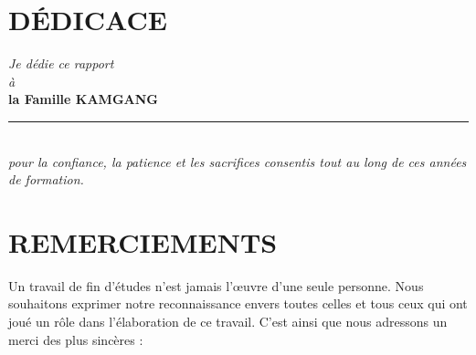 
\chapter*{DÉDICACE}

\vspace*{\fill}
\begin{center}
\begin{tcolorbox}[enhanced, nobeforeafter,
    colback=keycesoft, colframe=keyceaccent,
    boxrule=1.2pt, arc=10pt,
    width=0.78\textwidth,
    left=16pt, right=16pt, top=22pt, bottom=22pt,
    borderline={0.4pt}{5pt}{keyceaccent!55}]
  \centering
  {\large\itshape\color{keycegrey} Je dédie ce rapport}\\[12pt]
  {\large\itshape\color{keycegrey} à}\\[12pt]
  {\fontsize{19}{23}\selectfont\bfseries\color{keyceblue} la Famille KAMGANG}\\[16pt]
  {\color{keyceaccent}\rule{0.42\textwidth}{0.8pt}}\\[16pt]
  {\itshape\color{keycegrey} pour la confiance, la patience et les sacrifices
   consentis tout au long de ces années de formation.}
\end{tcolorbox}
\end{center}
\vspace*{\fill}

\cleardoublepage
{}
\chapter*{REMERCIEMENTS}

Un travail de fin d'études n'est jamais l'œuvre d'une seule personne. Nous
souhaitons exprimer notre reconnaissance envers toutes celles et tous ceux qui
ont joué un rôle dans l'élaboration de ce travail. C'est ainsi que nous
adressons un merci des plus sincères :

